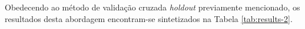 

	Obedecendo ao método de validação cruzada \emph{holdout} previamente mencionado, os resultados desta abordagem encontram-se sintetizados na Tabela \ref{tab:results-2}.

